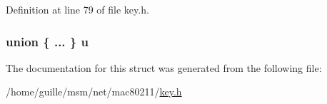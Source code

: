 Definition at line 79 of file key.\-h.

\hypertarget{structieee80211__key_aaf1be5c7d7653b795e11cb959246ee99}{
\subsubsection[{u}]{\setlength{\rightskip}{0pt plus 5cm}union \{ ... \}   u}}\label{structieee80211__key_aaf1be5c7d7653b795e11cb959246ee99}


The documentation for this struct was generated from the following file\-:\begin{DoxyCompactItemize}
\item 
/home/guille/msm/net/mac80211/\hyperlink{key_8h}{key.\-h}\end{DoxyCompactItemize}
